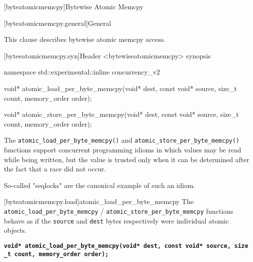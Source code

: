 
[byteatomicmemcpy]{Bytewise Atomic Memcpy}

[byteatomicmemcpy.general]{General}

This clause describes bytewise atomic memcpy access. 


[byteeatomicmemcpy.syn]{Header <bytewiseatomicmemcpy> synopsis}

\begin{codeblock}
namespace std::experimental::inline concurrency_v2 {

  void* atomic_load_per_byte_memcpy(void* dest, const void* source, size_t count, memory_order order);

  void* atomic_store_per_byte_memcpy(void* dest, const void* source, size_t count, memory_order order);


}
\end{codeblock}

\pnum

The \texttt{atomic\_load\_per\_byte\_memcpy()} and
\texttt{atomic\_store\_per\_byte\_memcpy()} functions support concurrent
programming idioms in which values may be read while being written, but
the value is trusted only when it can be determined after the fact that
a race did not occur. \begin{note} So-called "seqlocks" are the canonical
example of such an idiom. \end{note}


[byteatomicmemcpy.load]{atomic_load_per_byte_memcpy}
\pnum
The \texttt{atomic\_load\_per\_byte\_memcpy} /
\texttt{atomic\_store\_per\_byte\_memcpy} functions behave as if the
\texttt{source} and \texttt{dest} bytes respectively were individual
atomic objects.

\textbf{\texttt{void*\ atomic\_load\_per\_byte\_memcpy(void*\ dest,\ const\ void*\ source,\ size\_t\ count,\ memory\_order\ order);}}

